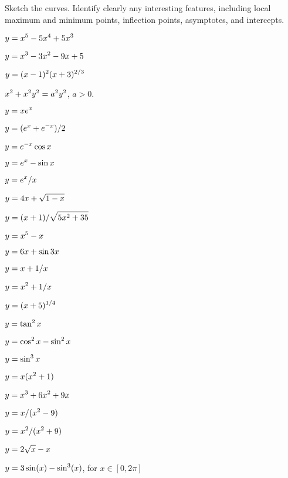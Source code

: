 \exercises

Sketch the curves. Identify clearly any interesting features, including
local maximum and minimum points, inflection points, asymptotes, and
intercepts. 

\twocol

\exercise $\displaystyle y=x^5-5x^4+5x^3$
\endexercise

\exercise $\displaystyle y=x^3-3x^2-9x+5$
\endexercise

\exercise $\displaystyle y=(x-1)^2(x+3)^{2/3}$
\endexercise

\exercise $\displaystyle x^2+x^2y^2=a^2y^2$, $a>0$.
\endexercise

\iflatetranscendentals
\elselatetranscendentals

\exercise $\displaystyle y=xe^x$
\endexercise

\exercise $\displaystyle y=(e^x+e^{-x})/2$
\endexercise

\exercise $\displaystyle y=e^{-x}\cos x$
\endexercise

\exercise $\displaystyle y=e^x-\sin x$
\endexercise

\exercise $\displaystyle y=e^x/x$
\endexercise

\filatetranscendentals


\exercise $\displaystyle y = 4x+\sqrt{1-x}$
\endexercise

\exercise $\displaystyle y = (x+1)/\sqrt{5x^2 + 35}$
\endexercise

\exercise $\displaystyle y= x^5 - x$
\endexercise

\exercise $\displaystyle y = 6x + \sin 3x$
\endexercise

\exercise $\displaystyle y = x+ 1/x$
\endexercise

\exercise $\displaystyle y = x^2+ 1/x$
\endexercise

\exercise $\displaystyle y = (x+5)^{1/4}$
\endexercise

\exercise $\displaystyle y = \tan^2 x$
\endexercise

\exercise $\displaystyle y =\cos^2 x - \sin^2 x$
\endexercise

\exercise $\displaystyle y = \sin^3 x$
\endexercise

\exercise $\displaystyle y=x(x^2+1)$
\endexercise

\exercise $\displaystyle y=x^3+6x^2 + 9x$
\endexercise

\exercise $\displaystyle y=x/(x^2-9)$
\endexercise

\exercise $\displaystyle y=x^2/(x^2+9)$
\endexercise

\exercise $\displaystyle y=2\sqrt{x} - x$
\endexercise

\exercise $\displaystyle y=3\sin(x) - \sin^3(x)$, for $x\in[0,2\pi]$
\endexercise

